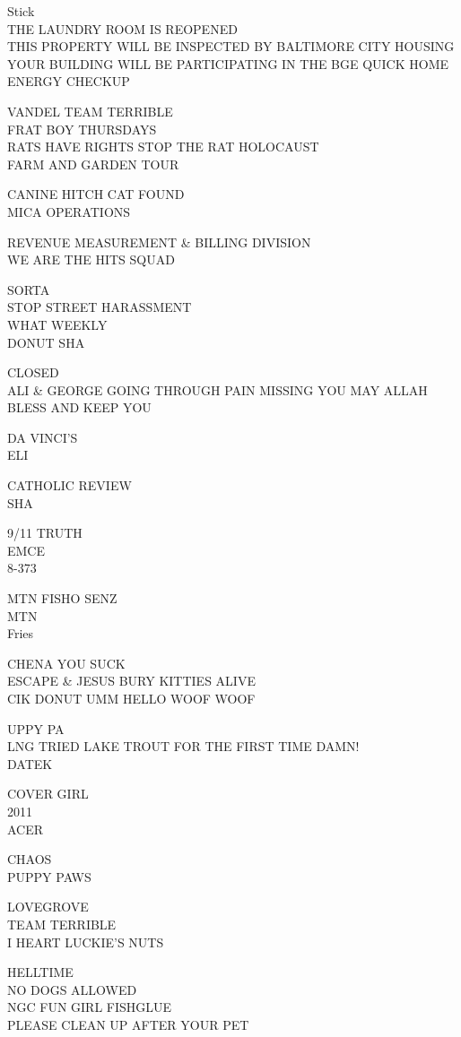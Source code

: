 \documentclass[10pt,letterpaper]{article}
\begin{document}
Stick\\
THE LAUNDRY ROOM IS REOPENED\\
THIS PROPERTY WILL BE INSPECTED BY BALTIMORE CITY HOUSING\\
YOUR BUILDING WILL BE PARTICIPATING IN THE BGE QUICK HOME ENERGY CHECKUP

VANDEL TEAM TERRIBLE\\
FRAT BOY THURSDAYS\\
RATS HAVE RIGHTS STOP THE RAT HOLOCAUST\\
FARM AND GARDEN TOUR

CANINE HITCH CAT FOUND\\
MICA OPERATIONS

REVENUE MEASUREMENT \& BILLING DIVISION\\
WE ARE THE HITS SQUAD

SORTA\\
STOP STREET HARASSMENT\\
WHAT WEEKLY\\
DONUT SHA

CLOSED\\
ALI \& GEORGE GOING THROUGH PAIN MISSING YOU MAY ALLAH BLESS AND KEEP YOU

DA VINCI'S\\
ELI

CATHOLIC REVIEW\\
SHA

9/11 TRUTH\\
EMCE\\
8{-}373

MTN FISHO SENZ\\
MTN\\
Fries

CHENA YOU SUCK\\
ESCAPE \& JESUS BURY KITTIES ALIVE\\
CIK DONUT UMM HELLO WOOF WOOF

UPPY PA\\
LNG TRIED LAKE TROUT FOR THE FIRST TIME DAMN!\\
DATEK

COVER GIRL\\
2011\\
ACER

CHAOS\\
PUPPY PAWS

LOVEGROVE\\
TEAM TERRIBLE\\
I HEART LUCKIE'S NUTS

HELLTIME\\
NO DOGS ALLOWED\\
NGC FUN GIRL FISHGLUE\\
PLEASE CLEAN UP AFTER YOUR PET
\end{document}
